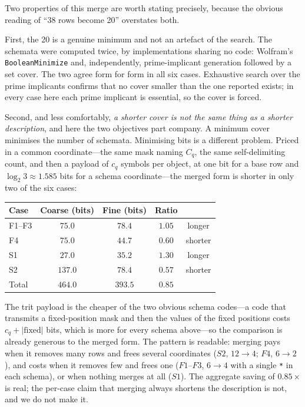 \documentclass[11pt]{article}
\begin{document}
Two properties of this merge are worth stating precisely, because the
obvious reading of ``38 rows become 20'' overstates both.

First, the 20 is a genuine minimum and not an artefact of the search.  The
schemata were computed twice, by implementations sharing no code: Wolfram's
\texttt{BooleanMinimize} and, independently, prime-implicant generation
followed by a set cover.  The two agree form for form in all six cases.
Exhaustive search over the prime implicants confirms that no cover smaller
than the one reported exists; in every case here each prime implicant is
essential, so the cover is forced.

Second, and less comfortably, \emph{a shorter cover is not the same thing as
a shorter description}, and here the two objectives part company.  A minimum
cover minimises the number of schemata.  Minimising bits is a different
problem.  Priced in a common coordinate---the same mask naming $C_q$, the same
self-delimiting count, and then a payload of $c_q$ symbols per object, at one
bit for a base row and $\log_2 3 \approx 1.585$ bits for a schema
coordinate---the merged form is shorter in only two of the six cases:

\begin{center}
\small
\begin{tabular}{@{}lcccc@{}}
\toprule
Case & Coarse (bits) & Fine (bits) & Ratio & \\
\midrule
F1--F3 & $75.0$ & $78.4$ & $1.05$ & longer \\
F4 & $75.0$ & $44.7$ & $0.60$ & shorter \\
S1 & $27.0$ & $35.2$ & $1.30$ & longer \\
S2 & $137.0$ & $78.4$ & $0.57$ & shorter \\
\midrule
Total & $464.0$ & $393.5$ & $0.85$ & \\
\bottomrule
\end{tabular}
\end{center}

The trit payload is the cheaper of the two obvious schema codes---a code that
transmits a fixed-position mask and then the values of the fixed positions
costs $c_q + |\text{fixed}|$ bits, which is more for every schema above---so
the comparison is already generous to the merged form.  The pattern is
readable: merging pays when it removes many rows and frees several coordinates
($S2$, $12 \to 4$; $F4$, $6 \to 2$), and costs when it removes few and frees
one ($F1$--$F3$, $6 \to 4$ with a single \texttt{*} in each schema), or when
nothing merges at all ($S1$).  The aggregate saving of $0.85\times$ is real;
the per-case claim that merging always shortens the description is not, and we
do not make it.
\end{document}
